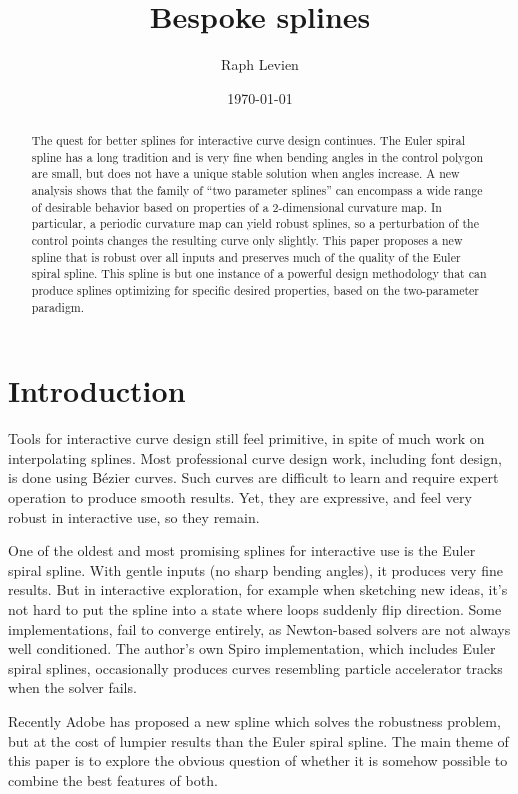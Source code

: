 \documentclass{article}
\title{Bespoke splines}
\author{Raph Levien}
\date{\today}
\begin{document}
\maketitle

\begin{abstract}
The quest for better splines for interactive curve design continues. The Euler spiral spline has a long tradition and is very fine when bending angles in the control polygon are small, but does not have a unique stable solution when angles increase. A new analysis shows that the family of ``two parameter splines'' can encompass a wide range of desirable behavior based on properties of a 2-dimensional curvature map. In particular, a periodic curvature map can yield robust splines, so a perturbation of the control points changes the resulting curve only slightly. This paper proposes a new spline that is robust over all inputs and preserves much of the quality of the Euler spiral spline. This spline is but one instance of a powerful design methodology that can produce splines optimizing for specific desired properties, based on the two-parameter paradigm.
\end{abstract}

\section{Introduction}

Tools for interactive curve design still feel primitive, in spite of much work on interpolating splines. Most professional curve design work, including font design, is done using B{\'e}zier curves. Such curves are difficult to learn and require expert operation to produce smooth results. Yet, they are expressive, and feel very robust in interactive use, so they remain.

One of the oldest and most promising splines for interactive use is the Euler spiral spline. With gentle inputs (no sharp bending angles), it produces very fine results. But in interactive exploration, for example when sketching new ideas, it's not hard to put the spline into a state where loops suddenly flip direction. Some implementations, fail to converge entirely, as Newton-based solvers are not always well conditioned. The author's own Spiro implementation, which includes Euler spiral splines, occasionally produces curves resembling particle accelerator tracks when the solver fails.

Recently Adobe has proposed a new spline \cite{Yan:2017:KCI:3072959.3073692} which solves the robustness problem, but at the cost of lumpier results than the Euler spiral spline. The main theme of this paper is to explore the obvious question of whether it is somehow possible to combine the best features of both.
\end{document}
